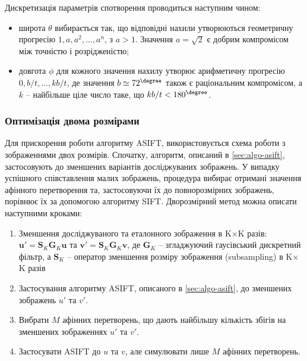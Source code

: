 
Дискретизація параметрів спотворення проводиться наступним чином:
\begin{itemize}
  \item широта $\theta$ вибирається так, що відповідні нахили утворюються геометричну прогресію $1, a, a^2, \ldots,a^n$, з $a>1$. Значення $a = \sqrt{2}$ є добрим компромісом між точністю і розрідженістю;
  \item довгота $\phi$ для кожного значення нахилу утворює арифметичну прогресію $0, b/t, \ldots, kb/t$, де значення $b \simeq 72^{\degree}$ також є раціональним компромісом, а $k$ -- найбільше ціле число таке, що $kb/t < 180^{\degree}$.
\end{itemize}


\subsubsection{Оптимізація двома розмірами}

Для прискорення роботи алгоритму ASIFT, використовується схема роботи з зображеннями двох розмірів. Спочатку, алгоритм, описаний в \ref{sec:algo-asift}, застосовують до зменшених варіантів досліджуваних зображень. У випадку успішного співставлення малих зображень, процедура вибирає отримані значення афінного перетворення та, застосовуючи їх до повнорозмірних зображень, порівнює їх за допомогою алгоритму SIFT. Дворозмірний метод можна описати наступними кроками:

\begin{enumerate}
  \item Зменшення досліджуваного та еталонного зображення в K$\times$K разів: $\mathbf{u}' = \mathbf{S}_K\mathbf{G}_K\mathbf{u}$ та $\mathbf{v}' = \mathbf{S}_K\mathbf{G}_K\mathbf{v}$, де $\mathbf{G}_K$ -- згладжуючий гаусівський дискретний фільтр, а $\textbf{S}_K$ -- оператор зменшення розміру зображення (subsampling) в K$\times$K разів
  \item Застосування алгоритму ASIFT, описаного в \ref{sec:algo-asift}, до зменшених зображень $u'$ та $v'$.
  \item Вибрати $M$ афінних перетворень, що дають найбільшу кількість збігів на зменшених зображеннях $u'$ та $v'$.
  \item Застосувати ASIFT до  $u$ та $v$, але симулювати лише $M$ афінних перетворень.
\end{enumerate}

